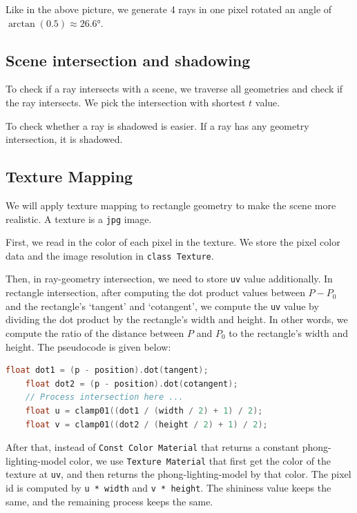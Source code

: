 \documentclass[acmtog]{acmart}
\begin{document}
Like in the above picture, we generate 4 rays in one pixel rotated an angle of $\arctan(0.5) \approx 26.6°$.

\subsection{Scene intersection and shadowing}

To check if a ray intersects with a scene, we traverse all geometries and check if the ray intersects. We pick the intersection with shortest $t$ value. 

To check whether a ray is shadowed is easier. If a ray has any geometry intersection, it is shadowed. 

\subsection{Texture Mapping}

We will apply texture mapping to rectangle geometry to make the scene more realistic. A texture is a \verb|jpg| image. 

First, we read in the color of each pixel in the texture. We store the pixel color data and the image resolution in \verb|class Texture|. 

Then, in ray-geometry intersection, we need to store \verb|uv| value additionally. In rectangle intersection, after computing the dot product values between $P-P_0$ and the rectangle's `tangent' and `cotangent', we compute the \verb|uv| value by dividing the dot product by the rectangle's width and height. In other words, we compute the ratio of the distance between $P$ and $P_0$ to the rectangle's width and height. The pseudocode is given below:

\begin{lstlisting}[language=C++]
	float dot1 = (p - position).dot(tangent);
	float dot2 = (p - position).dot(cotangent);
	// Process intersection here ...
	float u = clamp01((dot1 / (width / 2) + 1) / 2);
	float v = clamp01((dot2 / (height / 2) + 1) / 2);
\end{lstlisting}

After that, instead of \verb|Const Color Material| that returns a constant phong-lighting-model color, 
we use \verb|Texture Material| that first get the color of the texture at \verb|uv|, and then returns the phong-lighting-model by that color. 
The pixel id is computed by \verb|u * width| and \verb|v * height|.
The shininess value keeps the same, and the remaining process keeps the same. 
\end{document}

